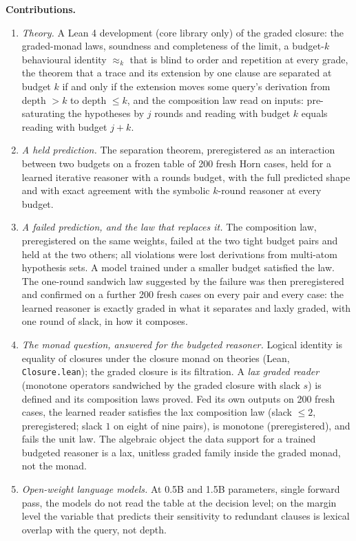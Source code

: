 \textbf{Contributions.}

\begin{enumerate}
\def\labelenumi{\arabic{enumi}.}
\tightlist
\item
  \emph{Theory.} A Lean 4 development (core library only) of the graded closure: the graded-monad laws, soundness and completeness of the limit, a budget-\(k\) behavioural identity \(\approx_k\) that is blind to order and repetition at every grade, the theorem that a trace and its extension by one clause are separated at budget \(k\) if and only if the extension moves some query's derivation from depth \(>k\) to depth \(\le k\), and the composition law read on inputs: pre-saturating the hypotheses by \(j\) rounds and reading with budget \(k\) equals reading with budget \(j+k\).
\item
  \emph{A held prediction.} The separation theorem, preregistered as an interaction between two budgets on a frozen table of 200 fresh Horn cases, held for a learned iterative reasoner with a rounds budget, with the full predicted shape and with exact agreement with the symbolic \(k\)-round reasoner at every budget.
\item
  \emph{A failed prediction, and the law that replaces it.} The composition law, preregistered on the same weights, failed at the two tight budget pairs and held at the two others; all violations were lost derivations from multi-atom hypothesis sets. A model trained under a smaller budget satisfied the law. The one-round sandwich law suggested by the failure was then preregistered and confirmed on a further 200 fresh cases on every pair and every case: the learned reasoner is exactly graded in what it separates and laxly graded, with one round of slack, in how it composes.
\item
  \emph{The monad question, answered for the budgeted reasoner.} Logical identity is equality of closures under the closure monad on theories (Lean, \texttt{Closure.lean}); the graded closure is its filtration. A \emph{lax graded reader} (monotone operators sandwiched by the graded closure with slack \(s\)) is defined and its composition laws proved. Fed its own outputs on 200 fresh cases, the learned reader satisfies the lax composition law (slack \(\le2\), preregistered; slack \(1\) on eight of nine pairs), is monotone (preregistered), and fails the unit law. The algebraic object the data support for a trained budgeted reasoner is a lax, unitless graded family inside the graded monad, not the monad.
\item
  \emph{Open-weight language models.} At 0.5B and 1.5B parameters, single forward pass, the models do not read the table at the decision level; on the margin level the variable that predicts their sensitivity to redundant clauses is lexical overlap with the query, not depth.

\end{enumerate}
